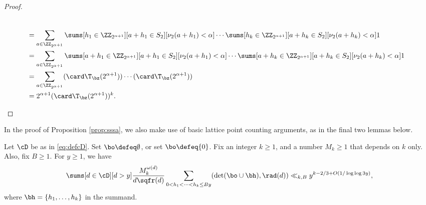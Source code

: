 \documentclass[12pt, reqno, twoside, letterpaper]{amsart}
\begin{document}
\begin{proof}
\begin{nixnix}
\begin{align*}
 \\ 
  & = 
   \sum_{a \in \ZZ_{2^{\alpha + 1}}}
    \sums[h_1 \in \ZZ_{2^{\alpha + 1}}][a + h_1 \in S_2][\nu_2(a + h_1) < \alpha]
     \cdots 
      \sums[h_k \in \ZZ_{2^{\alpha + 1}}][a + h_k \in S_2][\nu_2(a + h_k) < \alpha] 1
 \\
 & = 
   \sum_{a \in \ZZ_{2^{\alpha + 1}}}
    \sums[a + h_1 \in \ZZ_{2^{\alpha + 1}}][a + h_1 \in S_2][\nu_2(a + h_1) < \alpha]
     \cdots 
      \sums[a + h_k \in \ZZ_{2^{\alpha + 1}}][a + h_k \in S_2][\nu_2(a + h_k) < \alpha] 1   
 \\
 & = 
    \sum_{a \in \ZZ_{2^{\alpha + 1}}}
     (\card \T_{\bz}(2^{\alpha + 1}))
      \cdots 
       (\card \T_{\bz}(2^{\alpha + 1}))
 \\
 & = 
    2^{\alpha + 1}(\card \T_{\bz}(2^{\alpha + 1}))^k.
\end{align*}
%
\end{nixnix}
%
\end{proof}

In the proof of Proposition \ref{prop:sssa}, we also make use of 
basic lattice point counting arguments, as in the final two 
lemmas below.

\begin{lemma}
 \label{lem:dethap}
%
Let $\cD$ be as in \eqref{eq:defcD}.
%
Set $\bo \defeq \emptyset$, or set $\bo \defeq \{0\}$.
%
Fix an integer $k \ge 1$, and a number $M_k \ge 1$ that depends on 
$k$ only.
%
Also, fix $B \ge 1$.
%
For $y \ge 1$, we have
\begin{equation}
 \label{eq:lemdetbnd}
  \sums[d \in \cD][d > y] 
   \frac{M_k^{\omega(d)}}{d\sqfr(d)}
    \sum_{0 < h_1 < \cdots < h_k \le By}
    (\det(\bo \cup \bh),\rad(d))
      \ll_{k,B}
       y^{k - 2/3 + O(1/\log\log 3y)},
\end{equation}
where $\bh = \{h_1,\ldots,h_k\}$ in the summand.
\end{lemma}
\end{document}

